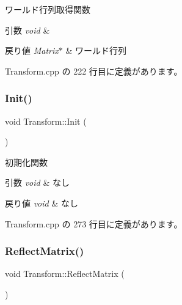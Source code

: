 ワールド行列取得関数 


\begin{DoxyParams}{引数}
{\em void} & \\
\hline
\end{DoxyParams}

\begin{DoxyRetVals}{戻り値}
{\em Matrix$\ast$} & ワールド行列 \\
\hline
\end{DoxyRetVals}


 Transform.\+cpp の 222 行目に定義があります。

\mbox{\label{class_transform_a4b911801aa231c13922c0e11032b8d5a}} 
\subsubsection{\texorpdfstring{Init()}{Init()}}
{\footnotesize\ttfamily void Transform\+::\+Init (\begin{DoxyParamCaption}{ }\end{DoxyParamCaption})}



初期化関数 


\begin{DoxyParams}{引数}
{\em void} & なし \\
\hline
\end{DoxyParams}

\begin{DoxyRetVals}{戻り値}
{\em void} & なし \\
\hline
\end{DoxyRetVals}


 Transform.\+cpp の 273 行目に定義があります。

\mbox{\label{class_transform_aaf47943b2583b4cb31a54881b5ef8eca}} 
\subsubsection{\texorpdfstring{Reflect\+Matrix()}{ReflectMatrix()}}
{\footnotesize\ttfamily void Transform\+::\+Reflect\+Matrix (\begin{DoxyParamCaption}{ }\end{DoxyParamCaption})\hspace{0.3cm}{\ttfamily [private]}}




